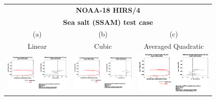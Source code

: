 \begin{figure}[htp]
  \centering
  \begin{tabular}{c c c}
    \multicolumn{3}{c}{\qquad\sffamily\textbf{NOAA-18 HIRS/4}}\\
    \multicolumn{3}{c}{\qquad\sffamily\textbf{Sea salt (SSAM) test case}}\\
    \qquad\textsf{(a)} & \qquad\textsf{(b)}  & \qquad\textsf{(c)} \\
    \qquad\textsf{Linear} & \qquad\textsf{Cubic}  & \qquad\textsf{Averaged Quadratic} \\
    \includegraphics[bb=90 400 300 540,clip,scale=0.7]{graphics/Aerosol/AD/hirs4_n18.ch8.SSAM.NLIN.dw_dReff.eps} &
    \includegraphics[bb=90 400 300 540,clip,scale=0.7]{graphics/Aerosol/AD/hirs4_n18.ch8.SSAM.NCUBIC.dw_dReff.eps} &
    \includegraphics[bb=90 400 300 540,clip,scale=0.7]{graphics/Aerosol/AD/hirs4_n18.ch8.SSAM.AVGQUAD.dw_dReff.eps}

\end{tabular}
\end{figure}
